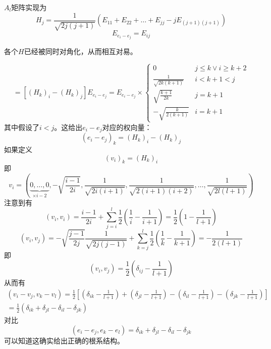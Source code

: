 \documentclass{ctexart}
\begin{document}
	$A_l$矩阵实现为
	\begin{equation}
	H_j=\frac{1}{\sqrt{2j(j+1)}}(E_{11}+E_{22}+\dots+E_{jj}-jE_{(j+1)(j+1)})
	\end{equation}
	\begin{equation}
	E_{e_i-e_j}=E_{ij}
	\end{equation}
	
	各个$H$已经被同时对角化，从而相互对易。
	
	\begin{equation}
	[H_k,E_{e_i-e_j}]=[(H_k)_i-(H_k)_j]E_{e_i-e_j}=E_{e_i-e_j}\times
	\begin{cases}
	0 & j\leq k\lor i\geq k+2\\
	\frac{1}{\sqrt{2k(k+1)}} & i<k+1<j\\
	\sqrt{\frac{k+1}{2k}} & j=k+1\\
	-\sqrt{\frac{k}{2(k+1)}} & i=k+1
	\end{cases}
	\end{equation}
	其中假设了$i<j$。这给出$e_i-e_j$对应的权向量：
	\begin{equation}
	(e_i-e_j)_k=(H_k)_i-(H_k)_j
	\end{equation}
	如果定义
	\begin{equation}
	(v_i)_k=(H_k)_i
	\end{equation}
	即
	\begin{equation}
	v_i=\left(\underbrace{0,\dots,0}_{\times i-2},-\sqrt{\frac{i-1}{2i}},\frac{1}{\sqrt{2i(i+1)}},\frac{1}{\sqrt{2(i+1)(i+2)}},\dots,\frac{1}{\sqrt{2l(l+1)}}\right)
	\end{equation}
	注意到有
	\begin{equation}
	(v_i,v_i)=\frac{i-1}{2i}+\sum_{j=i}^l\frac{1}{2}\left(\frac{1}{i}-\frac{1}{i+1}\right)=\frac{1}{2}\left(1-\frac{1}{l+1}\right)
	\end{equation}
	\begin{equation}
	(v_i,v_j)=-\sqrt{\frac{j-1}{2j}}\frac{1}{\sqrt{2j(j-1)}}+\sum_{k=j}^l\frac{1}{2}\left(\frac{1}{k}-\frac{1}{k+1}\right)=-\frac{1}{2(l+1)}
	\end{equation}
	即
	\begin{equation}
	(v_i,v_j)=\frac{1}{2}\left(\delta_{ij}-\frac{1}{l+1}\right)
	\end{equation}
	从而有
	\begin{multline}
	(v_i-v_j,v_k-v_l)=\frac{1}{2}\left[\left(\delta_{ik}-\frac{1}{l+1}\right)+\left(\delta_{jl}-\frac{1}{l+1}\right)-\left(\delta_{il}-\frac{1}{l+1}\right)-\left(\delta_{jk}-\frac{1}{l+1}\right)\right]\\=\frac{1}{2}(\delta_{ik}+\delta_{jl}-\delta_{il}-\delta_{jk})
	\end{multline}
	对比
	\begin{equation}
	(e_i-e_j,e_k-e_l)=\delta_{ik}+\delta_{jl}-\delta_{il}-\delta_{jk}
	\end{equation}
	可以知道这确实给出正确的根系结构。
	
\end{document}
